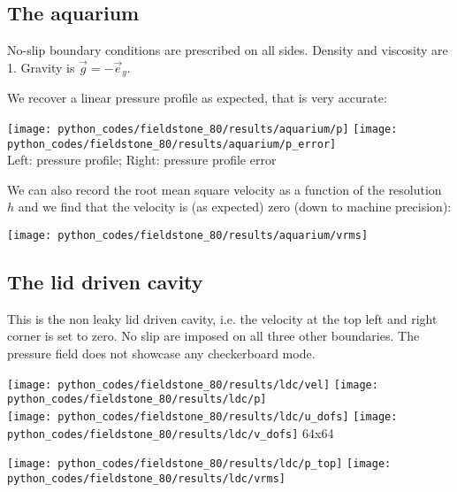 \subsection*{The aquarium}

No-slip boundary conditions are prescribed on all sides. Density and viscosity are 1.
Gravity is $\vec{g}=-\vec{e}_y$. 

We recover a linear pressure profile as expected, that is very accurate:

\begin{center}
\texttt{[image: python\_codes/fieldstone\_80/results/aquarium/p]}
\texttt{[image: python\_codes/fieldstone\_80/results/aquarium/p\_error]}\\
{\captionfont Left: pressure profile; Right: pressure profile error}
\end{center}

We can also record the root mean square velocity as a function of the resolution $h$
and we find that the velocity is (as expected) zero (down to machine precision):
\begin{center}
\texttt{[image: python\_codes/fieldstone\_80/results/aquarium/vrms]}
\end{center}


\subsection*{The lid driven cavity}

This is the non leaky lid driven cavity, i.e. the velocity at the top left and right corner 
is set to zero. No slip are imposed on all three other boundaries. 
The pressure field does not showcase any checkerboard mode. 

\begin{center}
\texttt{[image: python\_codes/fieldstone\_80/results/ldc/vel]}
\texttt{[image: python\_codes/fieldstone\_80/results/ldc/p]}\\
\texttt{[image: python\_codes/fieldstone\_80/results/ldc/u\_dofs]}
\texttt{[image: python\_codes/fieldstone\_80/results/ldc/v\_dofs]}
{\captionfont 64x64}
\end{center}

\begin{center}
\texttt{[image: python\_codes/fieldstone\_80/results/ldc/p\_top]}
\texttt{[image: python\_codes/fieldstone\_80/results/ldc/vrms]}
\end{center}

